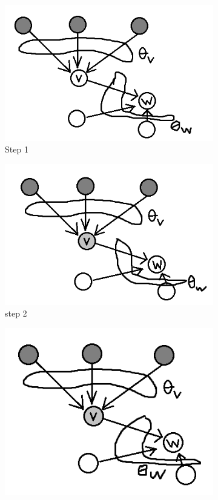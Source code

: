 \begin{figure}[!ht]
	\begin{subfigure}{0.3\textwidth}
		\includegraphics[width=\textwidth]{Figures/linearThreshold}
		\caption{Step 1 } 
		\label{fig:linearThresh}
	\end{subfigure}
	\begin{subfigure}{0.3\textwidth}
		\includegraphics[width=\textwidth]{Figures/linearThreshold2}
		\caption{step 2 } 
		\label{fig:linearThresh2}
	\end{subfigure}
	\begin{subfigure}{0.3\textwidth}
		\includegraphics[width=\textwidth]{Figures/linearThreshold3}

\end{subfigure}
\end{figure}

